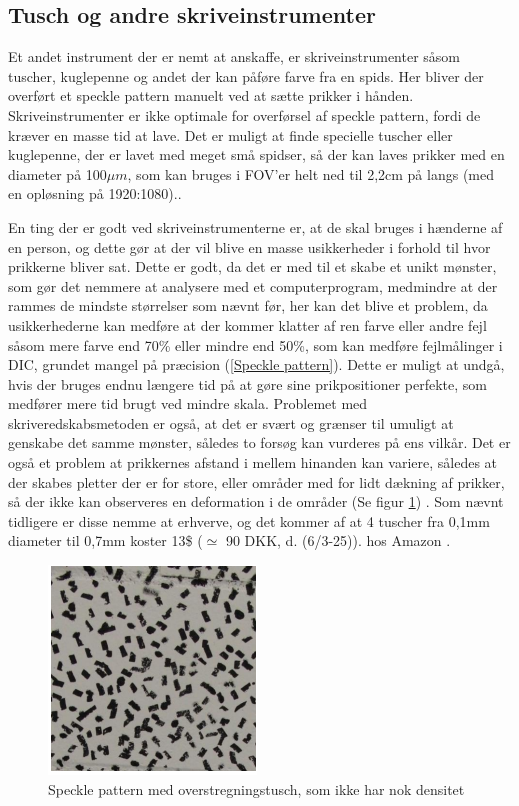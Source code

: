 \subsection{Tusch og andre skriveinstrumenter} Et andet instrument der er nemt at anskaffe, er skriveinstrumenter såsom tuscher, kuglepenne og andet der kan påføre farve fra en spids. Her bliver der overført et speckle pattern manuelt ved at sætte prikker i hånden. Skriveinstrumenter er ikke optimale for overførsel af speckle pattern, fordi de kræver en masse tid at lave. Det er muligt at finde specielle tuscher eller kuglepenne, der er lavet med meget små spidser, så der kan laves prikker med en diameter på 100$\mu m$, som kan bruges i FOV'er helt ned til 2,2cm på langs (med en opløsning på 1920:1080).\parencite{Dong2017ACorrelation}. 

En ting der er godt ved skriveinstrumenterne er, at de skal bruges i hænderne af en person, og dette gør at der vil blive en masse usikkerheder i forhold til hvor prikkerne bliver sat. Dette er godt, da det er med til et skabe et unikt mønster, som gør det nemmere at analysere med et computerprogram, medmindre at der rammes de mindste størrelser som nævnt før, her kan det blive et problem, da usikkerhederne kan medføre at der kommer klatter af ren farve eller andre fejl såsom mere farve end 70\% eller mindre end 50\%, som kan medføre fejlmålinger i DIC, grundet mangel på præcision (\ref{Speckle pattern}). Dette er muligt at undgå, hvis der bruges endnu længere tid på at gøre sine prikpositioner perfekte, som medfører mere tid brugt ved mindre skala. Problemet med skriveredskabsmetoden er også, at det er svært og grænser til umuligt at genskabe det samme mønster, således to forsøg kan vurderes på ens vilkår. Det er også et problem at prikkernes afstand i mellem hinanden kan variere, således at der skabes pletter der er for store, eller områder med for lidt dækning af prikker, så der ikke kan observeres en deformation i de områder (Se figur \ref{SpeckleTusch}) \parencite{HoseinSalmanpour2013PDFWalls}. Som nævnt tidligere er disse nemme at erhverve, og det kommer af at 4 tuscher fra 0,1mm diameter til 0,7mm koster 13\$ ($\simeq$ 90 DKK, d. (6/3-25)). hos Amazon \parencite{STAEDTLER2025Amazon.comTousch}.
\begin{figure}[H]
    \centering
    \includegraphics[width=0.4\linewidth]{Sections/2 Problemanalyse/Media/Tusch.png}
    \caption{Speckle pattern med overstregningstusch, som ikke har nok densitet \parencite{HoseinSalmanpour2013PDFWalls}}
    \label{SpeckleTusch}
\end{figure}

